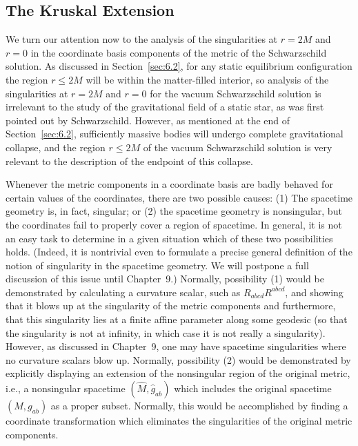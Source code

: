 
\subsection{The Kruskal Extension}\label{sec:6.4}

We turn our attention now to the analysis of the singularities at \(r=2M\) and
\(r=0\) in the coordinate basis components of the metric of the Schwarzschild
solution. As discussed in Section~\ref{sec:6.2}, for any static equilibrium
configuration the region \(r\leq2M\) will be within the matter-filled interior,
so analysis of the singularities at \(r=2M\) and \(r=0\) for the vacuum
Schwarzschild solution is irrelevant to the study of the gravitational field of a
static star, as was first pointed out by Schwarzschild. However, as mentioned at
the end of Section~\ref{sec:6.2}, sufficiently massive bodies will undergo
complete gravitational collapse, and the region \(r\leq2M\) of the vacuum
Schwarzschild solution is very relevant to the description of the endpoint of
this collapse.

Whenever the metric components in a coordinate basis are badly behaved for
certain values of the coordinates, there are two possible causes: (1) The
spacetime geometry is, in fact, singular; or (2) the spacetime geometry is
nonsingular, but the coordinates fail to properly cover a region of spacetime. In
general, it is not an easy task to determine in a given situation which of these
two possibilities holds. (Indeed, it is nontrivial even to formulate a precise
general definition of the notion of singularity in the spacetime geometry. We will
postpone a full discussion of this issue until Chapter~9.) Normally, possibility
(1) would be demonstrated by calculating a curvature scalar, such as
\(R_{abcd}R^{abcd}\), and showing that it blows up at the singularity of the
metric components and furthermore, that this singularity lies at a finite affine
parameter along some geodesic (so that the singularity is not at infinity, in
which case it is not really a singularity). However, as discussed in Chapter~9,
one may have spacetime singularities where no curvature scalars blow up.
Normally, possibility (2) would be demonstrated by explicitly displaying an
extension of the nonsingular region of the original metric, i.e., a nonsingular
spacetime \((\hat M,\hat g_{ab})\) which includes the original spacetime
\((M,g_{ab})\) as a proper subset. Normally, this would be accomplished by finding
a coordinate transformation which eliminates the singularities of the original
metric components.

